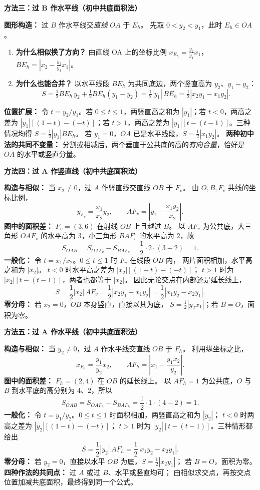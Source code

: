 \begin{proofbox}
\textbf{\textcolor{CProof}{方法三：过 B 作水平线（初中共底面积法）}}

\textbf{图形构造：} 过 $B$ 作水平线交\emph{直线} $OA$ 于 $E_h$。
先取 $0<y_2<y_1$，此时 $E_h\in OA$。
\begin{enumerate}[leftmargin=*,itemsep=0.25em]
\item \textbf{为什么相似换了方向？} 由直线 OA 上的坐标比例
$x_{E_h}=\frac{y_2}{y_1}x_1$，$BE_h=|x_2-\frac{y_2}{y_1}x_1|$。
\item \textbf{为什么也能合并？} 以水平线段 $BE_h$ 为共同底边，两个竖直高为 $y_2$、$y_1-y_2$：
\[
 S=\tfrac12 BE_h\,y_2+\tfrac12 BE_h(y_1-y_2)
 =\tfrac12 |y_1|\,BE_h
 =\tfrac12|x_2y_1-x_1y_2|.
\]
\end{enumerate}
\textbf{位置扩展：} 令 $t=y_2/y_1$。若 $0\le t\le1$，两竖直高之和为 $|y_1|$；若 $t<0$，两高之差为 $|y_1|[(1-t)-(-t)]$；若 $t>1$，两高之差为 $|y_1|[t-(t-1)]$。三种情况均得 $S=\frac12|y_1|BE_h$。
若 $y_1=0$，$OA$ 已是水平线段，$S=\tfrac12|x_1y_2|$。
\textbf{两种初中法的共同不变量：} 分割或相减后，两个垂直于公共底的高的\emph{有向合量}，恰好是 $OA$ 的水平或竖直分量。

\medskip
\end{proofbox}
\clearpage
\begin{proofbox}
\textbf{\textcolor{CProof}{方法四：过 A 作竖直线（初中共底面积法）}}

\textbf{构造与相似：} 当 $x_2\ne0$，过 $A$ 作竖直线交直线 $OB$ 于 $F_v$。
由 $O,B,F_v$ 共线的坐标比例，
\[
 y_{F_v}=\frac{x_1}{x_2}y_2,\qquad
 AF_v=\left|y_1-\frac{x_1y_2}{x_2}\right|.
\]
\textbf{图中的面积差：} $F_v=(3,6)$ 在射线 $OB$ 上且越过 $B$。
以 $AF_v$ 为公共底，大三角形 $OAF_v$ 的水平高为 $3$，小三角形 $BAF_v$ 的水平高为 $2$，故
\[
 S_{OAB}=S_{OAF_v}-S_{BAF_v}
 =\frac12\cdot2\cdot(3-2)=1.
\]
\textbf{一般化：} 令 $t=x_1/x_2$。$0\le t\le1$ 时 $F_v$ 在线段 $OB$ 内，
两片面积相加，水平高之和为 $|x_2|$。
$t<0$ 时水平高之差为 $|x_2|[(1-t)-(-t)]$；
$t>1$ 时为 $|x_2|[t-(t-1)]$，两者也都等于 $|x_2|$。
因此无论交点在内部还是延长线上，
\[
 S=\frac12|x_2|\,AF_v
 =\frac12|x_2y_1-x_1y_2|
 =\boxed{\frac12|x_1y_2-x_2y_1|}.
\]
\textbf{零分母：} 若 $x_2=0$，$OB$ 本身竖直，直接以其为底，
$S=\frac12|y_2x_1|$；若 $B=O$，面积为零。
\end{proofbox}
\clearpage
\begin{proofbox}
\textbf{\textcolor{CProof}{方法五：过 A 作水平线（初中共底面积法）}}

\textbf{构造与相似：} 当 $y_2\ne0$，过 $A$ 作水平线交直线 $OB$ 于 $F_h$。
利用纵坐标之比，
\[
 x_{F_h}=\frac{y_1}{y_2}x_2,\qquad
 AF_h=\left|x_1-\frac{y_1x_2}{y_2}\right|.
\]
\textbf{图中的面积差：} $F_h=(2,4)$ 在 $OB$ 的延长线上。
以 $AF_h=1$ 为公共底，$O$ 与 $B$ 到水平底的高分别为 $4$、$2$，所以
\[
 S_{OAB}=S_{OAF_h}-S_{BAF_h}
 =\frac12\cdot1\cdot(4-2)=1.
\]
\textbf{一般化：} 令 $t=y_1/y_2$。$0\le t\le1$ 时面积相加，两竖直高之和为 $|y_2|$；
$t<0$ 时两高之差为 $|y_2|[(1-t)-(-t)]$；
$t>1$ 时为 $|y_2|[t-(t-1)]$。三种情形都给出
\[
 S=\frac12|y_2|\,AF_h
 =\frac12|x_1y_2-x_2y_1|.
\]
\textbf{零分母：} 若 $y_2=0$，直接以水平 $OB$ 为底，$S=\frac12|x_2y_1|$；
若 $B=O$，面积为零。
\textbf{四种作法的共同点：} 过 $A$ 或过 $B$、水平或竖直均可；
由相似求交点，再按交点位置加减共底面积，最终得到同一个公式。
\end{proofbox}
